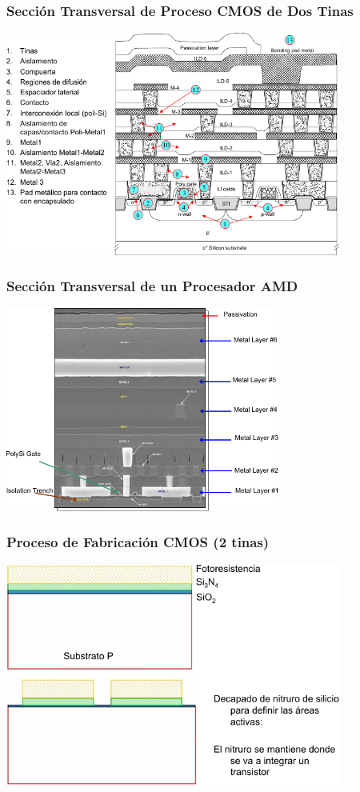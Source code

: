 \documentclass[aspectratio=169,10pt]{beamer}
\begin{document}
\begin{frame}
\frametitle{Sección Transversal de Proceso CMOS de Dos Tinas}
\centering
\includegraphics[width=11cm]{CMOS-process}
\end{frame}


\begin{frame}
\frametitle{Sección Transversal de un Procesador AMD}
\centering
\includegraphics[width=9cm]{AMD}
\end{frame}


\begin{frame}
\frametitle{Proceso de Fabricación CMOS (2 tinas)}
\centering
\includegraphics[width=11cm]{CMOS1}
\end{frame}
\end{document}
